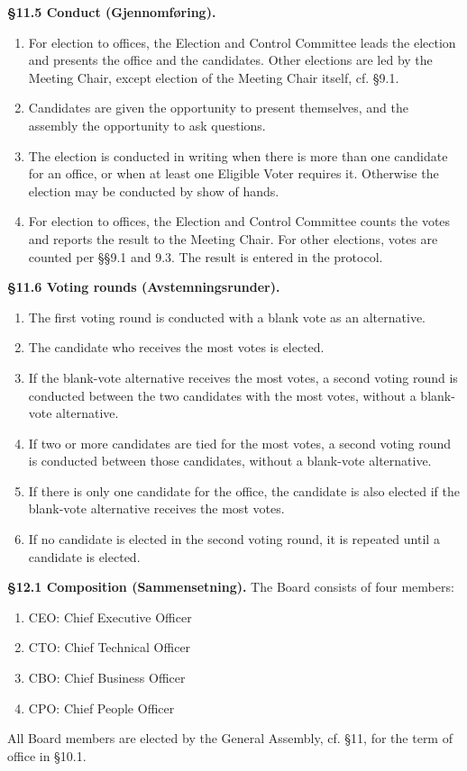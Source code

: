 \documentclass{../../../Common/Latex/Templates/rapport}
\begin{document}
\textbf{\S 11.5 Conduct (Gjennomføring).}
\begin{enumerate}
  \item For election to offices, the Election and Control Committee leads the election and presents the office and the candidates. Other elections are led by the Meeting Chair, except election of the Meeting Chair itself, cf. \S9.1.
  \item Candidates are given the opportunity to present themselves, and the assembly the opportunity to ask questions.
  \item The election is conducted in writing when there is more than one candidate for an office, or when at least one Eligible Voter requires it. Otherwise the election may be conducted by show of hands.
  \item For election to offices, the Election and Control Committee counts the votes and reports the result to the Meeting Chair. For other elections, votes are counted per \S\S9.1 and 9.3. The result is entered in the protocol.
\end{enumerate}

\textbf{\S 11.6 Voting rounds (Avstemningsrunder).}
\begin{enumerate}
  \item The first voting round is conducted with a blank vote as an alternative.
  \item The candidate who receives the most votes is elected.
  \item If the blank-vote alternative receives the most votes, a second voting round is conducted between the two candidates with the most votes, without a blank-vote alternative.
  \item If two or more candidates are tied for the most votes, a second voting round is conducted between those candidates, without a blank-vote alternative.
  \item If there is only one candidate for the office, the candidate is also elected if the blank-vote alternative receives the most votes.
  \item If no candidate is elected in the second voting round, it is repeated until a candidate is elected.
\end{enumerate}

\textbf{\S 12.1 Composition (Sammensetning).} The Board consists of four members:
\begin{enumerate}
  \item CEO: Chief Executive Officer
  \item CTO: Chief Technical Officer
  \item CBO: Chief Business Officer
  \item CPO: Chief People Officer
\end{enumerate}
All Board members are elected by the General Assembly, cf. \S11, for the term of office in \S10.1.
\end{document}

